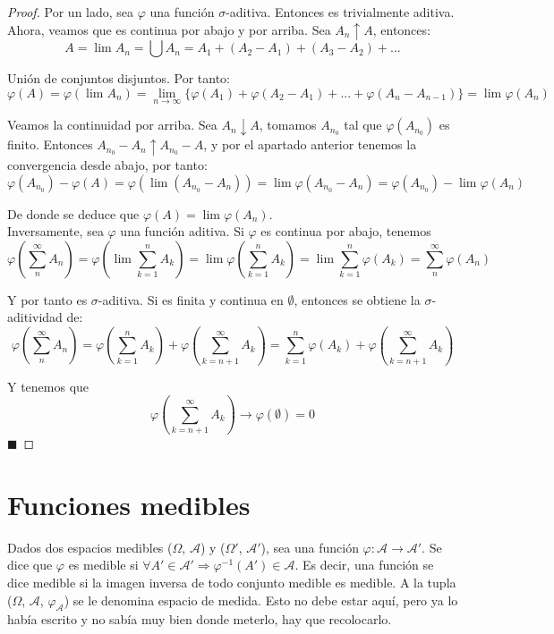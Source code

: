 \documentclass[12pt,a4paper]{book}
\newcommand*{\qed}{\hfill\ensuremath{\blacksquare}}
\begin{document}
\begin{proof}
Por un lado, sea $\varphi$ una función $\sigma$-aditiva. Entonces es trivialmente aditiva. Ahora, veamos que es continua por abajo y por arriba. Sea $A_n \uparrow A$, entonces:
$$ A = \lim A_n = \bigcup A_n = A_1 + (A_2 - A_1) + (A_3 - A_2) +... $$

Unión de conjuntos disjuntos. Por tanto:
$$ \varphi (A) = \varphi (\lim A_n) = \lim_{n \to \infty } \{ \varphi (A_1) + \varphi (A_2 - A_1) + ... + \varphi (A_n - A_{n-1}) \} = \lim \varphi (A_n) $$

Veamos la continuidad por arriba. Sea $A_n \downarrow A$, tomamos $A_{n_0}$ tal que $\varphi (A_{n_0})$ es finito. Entonces $A_{n_0} - A_n \uparrow A_{n_0} - A$, y por el apartado anterior tenemos la convergencia desde abajo, por tanto:
$$ \varphi (A_{n_0}) - \varphi (A) = \varphi (\lim (A_{n_0} - A_n)) = \lim \varphi (A_{n_0} - A_n) = \varphi (A_{n_0}) - \lim \varphi (A_n) $$

De donde se deduce que $ \varphi (A) = \lim \varphi (A_n) $.\\

Inversamente, sea $ \varphi$ una función aditiva. Si $\varphi$ es continua por abajo, tenemos
$$ \varphi \left( \sum_{n}^{\infty} A_n \right) = \varphi \left( \lim \sum_{k=1}^n A_k \right) = \lim \varphi \left( \sum_{k=1}^n A_k \right) = \lim \sum_{k=1}^n \varphi \left( A_k \right) = \sum_{n}^{\infty} \varphi (A_n) $$

Y por tanto es $\sigma$-aditiva. Si es finita y continua en $\emptyset$, entonces se obtiene la $\sigma$-aditividad de:
$$ \varphi \left( \sum_{n}^{\infty} A_n \right) = \varphi \left( \sum_{k=1}^{n} A_k \right) + \varphi \left( \sum_{k=n+1}^{\infty} A_k \right) = \sum_{k=1}^{n} \varphi (A_k) + \varphi \left( \sum_{k=n+1}^{\infty} A_k \right) $$

Y tenemos que 
$$ \varphi \left( \sum_{k=n+1}^{\infty} A_k \right) \to \varphi (\emptyset) = 0 $$
\qed 
\end{proof}

\section{Funciones medibles}

Dados dos espacios medibles ($\Omega$, $\mathcal{A}$) y ($\Omega'$, $\mathcal{A}'$), sea una función $\varphi : \mathcal{A} \rightarrow \mathcal{A}'$. Se dice que $\varphi$ es medible si $\forall A' \in \mathcal{A}' \Rightarrow \varphi^{-1}(A') \in \mathcal{A}$. Es decir, una función se dice medible si la imagen inversa de todo conjunto medible es medible. A la tupla ($\Omega$, $\mathcal{A}$, $\varphi_{\mathcal{A}}$) se le denomina espacio de medida. Esto no debe estar aquí, pero ya lo había escrito y no sabía muy bien donde meterlo, hay que recolocarlo.
\end{document}
